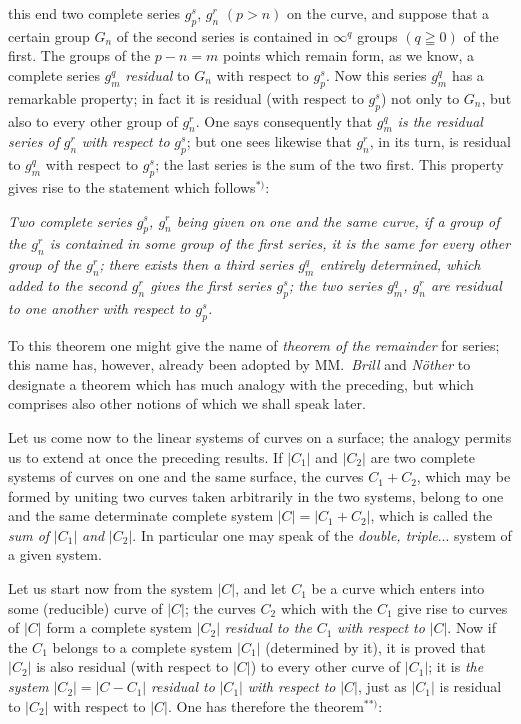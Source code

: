 \documentclass{article}
\begin{document}
this end two complete series $g_{p}^{s}$, $g_{n}^{r}$ $(p > n)$ on the curve, and suppose that a certain group $G_{n}$ of the second series is contained in $\infty^{q}$ groups $(q \geqq 0)$ of the first. The groups of the $p - n = m$ points which remain form, as we know, a complete series $g_{m}^{q}$ \emph{residual} to $G_{n}$ with respect to $g_{p}^{s}$. Now this series $g_{m}^{q}$ has a remarkable property; in fact it is residual (with respect to $g_{p}^{s}$) not only to $G_{n}$, but also to every other group of $g_{n}^{r}$. One says consequently that $g_{m}^{q}$ \emph{is the residual series of} $g_{n}^{r}$ \emph{with respect to} $g_{p}^{s}$; but one sees likewise that $g_{n}^{r}$, in its turn, is residual to $g_{m}^{q}$ with respect to $g_{p}^{s}$; the last series is the sum of the two first. This property gives rise to the statement which follows${}^{*)}$:

\emph{Two complete series $g_{p}^{s}$, $g_{n}^{r}$ being given on one and the same curve, if a group of the $g_{n}^{r}$ is contained in some group of the first series, it is the same for every other group of the $g_{n}^{r}$; there exists then a third series $g_{m}^{q}$ entirely determined, which added to the second $g_{n}^{r}$ gives the first series $g_{p}^{s}$; the two series $g_{m}^{q}$, $g_{n}^{r}$ are residual to one another with respect to $g_{p}^{s}$.}

To this theorem one might give the name of \emph{theorem of the remainder} for series; this name has, however, already been adopted by MM.\ \emph{Brill} and \emph{Nöther} to designate a theorem which has much analogy with the preceding, but which comprises also other notions of which we shall speak later.

Let us come now to the linear systems of curves on a surface; the analogy permits us to extend at once the preceding results. If $|C_{1}|$ and $|C_{2}|$ are two complete systems of curves on one and the same surface, the curves $C_{1} + C_{2}$, which may be formed by uniting two curves taken arbitrarily in the two systems, belong to one and the same determinate complete system $|C| = |C_{1} + C_{2}|$, which is called the \emph{sum of} $|C_{1}|$ \emph{and} $|C_{2}|$. In particular one may speak of the \emph{double, triple}... system of a given system.

Let us start now from the system $|C|$, and let $C_{1}$ be a curve which enters into some (reducible) curve of $|C|$; the curves $C_{2}$ which with the $C_{1}$ give rise to curves of $|C|$ form a complete system $|C_{2}|$ \emph{residual to the} $C_{1}$ \emph{with respect to} $|C|$. Now if the $C_{1}$ belongs to a complete system $|C_{1}|$ (determined by it), it is proved that $|C_{2}|$ is also residual (with respect to $|C|$) to every other curve of $|C_{1}|$; it is \emph{the system} $|C_{2}| = |C - C_{1}|$ \emph{residual to} $|C_{1}|$ \emph{with respect to} $|C|$, just as $|C_{1}|$ is residual to $|C_{2}|$ with respect to $|C|$. One has therefore the theorem${}^{**)}$:
\end{document}
